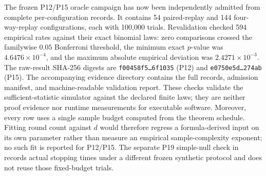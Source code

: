 The frozen P12/P15 oracle campaign has now been independently admitted from
complete per-configuration records.  It contains 54 paired-replay and 144
four-way-replay configurations, each with 100,000 trials.  Revalidation checked
594 empirical rates against their exact binomial laws: zero comparisons crossed
the familywise $0.05$ Bonferroni threshold, the minimum exact $p$-value was
$4.6476\times10^{-4}$, and the maximum absolute empirical deviation was
$2.4271\times10^{-3}$.  The raw-result SHA-256 digests are
\texttt{f00458f5\ldots 6f1035} (P12) and
\texttt{e0750e5d\ldots 274ab} (P15).  The accompanying evidence directory
contains the full records, admission manifest, and machine-readable validation
report.  These checks validate the sufficient-statistic simulator against the
declared finite laws; they are neither proof evidence nor runtime measurements
for executable software.  Moreover, every row uses a single sample budget
computed from the theorem schedule.  Fitting round count against $d$ would
therefore regress a formula-derived input on its own parameter rather than
measure an empirical sample-complexity exponent; no such fit is reported for
P12/P15. The separate P19 simple-null check in
 records actual stopping times under a different
frozen synthetic protocol and does not reuse those fixed-budget trials.
